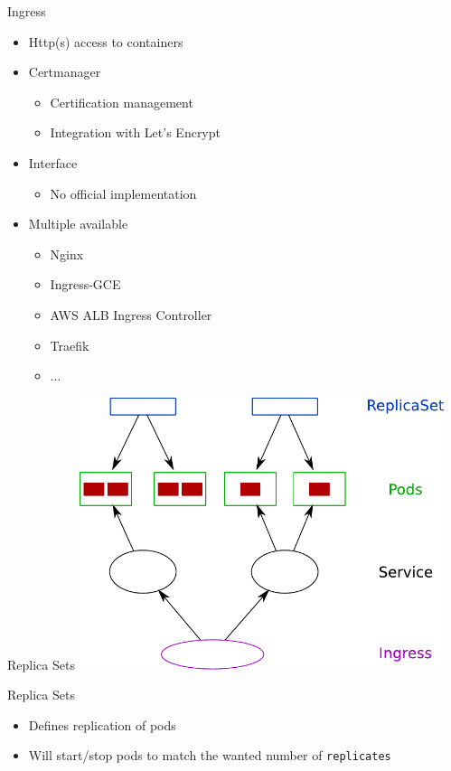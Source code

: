 \documentclass{dcpresentation}
\begin{document}
 \begin{frame}{Ingress}
  \begin{itemize}
   \item Http(s) access to containers
   \item Certmanager
   \begin{itemize}
    \item Certification management
    \item Integration with Let's Encrypt
   \end{itemize}
   \item Interface
   \begin{itemize}
    \item No official implementation
   \end{itemize}
   \item Multiple available
   \begin{itemize}
    \item Nginx
    \item Ingress-GCE
    \item AWS ALB Ingress Controller
    \item Traefik
    \item ...
   \end{itemize}
  \end{itemize}
 \end{frame}
 
 
 \begin{frame}{Replica Sets}
  \centering
  \includegraphics[width=0.8\textwidth]{img/arch-psir.pdf}
 \end{frame}
 
 \begin{frame}{Replica Sets}
  \begin{itemize}
   \item Defines replication of pods
   \item Will start/stop pods to match the wanted number of \texttt{replicates}
  \end{itemize}
 \end{frame}
\end{document}
